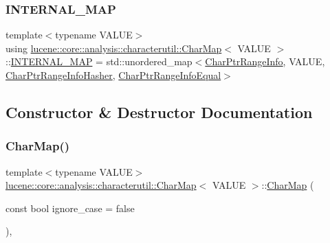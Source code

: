 \subsubsection{\texorpdfstring{I\+N\+T\+E\+R\+N\+A\+L\+\_\+\+M\+AP}{INTERNAL\_MAP}}
{\footnotesize\ttfamily template$<$typename V\+A\+L\+UE$>$ \\
using \mbox{\hyperlink{classlucene_1_1core_1_1analysis_1_1characterutil_1_1CharMap}{lucene\+::core\+::analysis\+::characterutil\+::\+Char\+Map}}$<$ V\+A\+L\+UE $>$\+::\mbox{\hyperlink{classlucene_1_1core_1_1analysis_1_1characterutil_1_1CharMap_a0fe744ab48aa6f998a3d7e159a351d69}{I\+N\+T\+E\+R\+N\+A\+L\+\_\+\+M\+AP}} =  std\+::unordered\+\_\+map$<$\mbox{\hyperlink{classlucene_1_1core_1_1analysis_1_1characterutil_1_1CharPtrRangeInfo}{Char\+Ptr\+Range\+Info}}, V\+A\+L\+UE, \mbox{\hyperlink{classlucene_1_1core_1_1analysis_1_1characterutil_1_1CharPtrRangeInfoHasher}{Char\+Ptr\+Range\+Info\+Hasher}}, \mbox{\hyperlink{classlucene_1_1core_1_1analysis_1_1characterutil_1_1CharPtrRangeInfoEqual}{Char\+Ptr\+Range\+Info\+Equal}}$>$\hspace{0.3cm}{\ttfamily [private]}}



\subsection{Constructor \& Destructor Documentation}
\mbox{\label{classlucene_1_1core_1_1analysis_1_1characterutil_1_1CharMap_ab593676daf8740d5f8394fabac807460}} 
\subsubsection{\texorpdfstring{Char\+Map()}{CharMap()}\hspace{0.1cm}{\footnotesize\ttfamily [1/5]}}
{\footnotesize\ttfamily template$<$typename V\+A\+L\+UE$>$ \\
\mbox{\hyperlink{classlucene_1_1core_1_1analysis_1_1characterutil_1_1CharMap}{lucene\+::core\+::analysis\+::characterutil\+::\+Char\+Map}}$<$ V\+A\+L\+UE $>$\+::\mbox{\hyperlink{classlucene_1_1core_1_1analysis_1_1characterutil_1_1CharMap}{Char\+Map}} (\begin{DoxyParamCaption}\item[{const bool}]{ignore\+\_\+case = {\ttfamily false} }\end{DoxyParamCaption})\hspace{0.3cm}{\ttfamily [inline]}, {\ttfamily [explicit]}}


